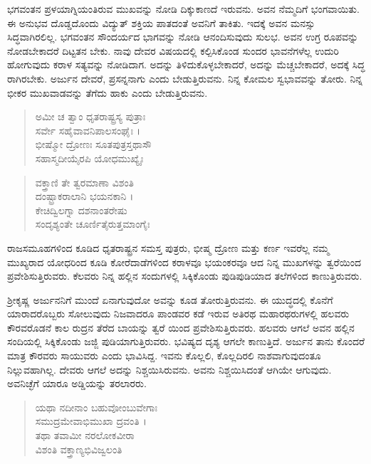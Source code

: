 ಭಗವಂತನ ಪ್ರಳಯಾಗ್ನಿಯಂತಿರುವ ಮುಖವನ್ನು ನೋಡಿ ದಿಕ್ಕುಕಾಣದೆ ಇರುವನು. ಅವನ ನೆಮ್ಮದಿಗೆ ಭಂಗವಾಯಿತು. ಈ ಅನುಭವ ದೊಡ್ಡದೊಂದು ವಿದ್ಯುತ್ ಶಕ್ತಿಯ ಪಾತದಂತೆ ಅವನಿಗೆ ತಾಕಿತು. ಇದಕ್ಕೆ ಅವನ ಮನಸ್ಸು ಸಿದ್ಧವಾಗಿರಲಿಲ್ಲ. ಭಗವಂತನ ಸೌಂದರ್ಯದ ಭಾಗವನ್ನು ನೋಡಿ ಆನಂದಿಸುವುದು ಸುಲಭ. ಅವನ ಉಗ್ರ ರೂಪವನ್ನು ನೋಡಬೇಕಾದರೆ ದಿಟ್ಟತನ ಬೇಕು. ನಾವು ದೇವರ ವಿಷಯದಲ್ಲಿ ಕಲ್ಪಿಸಿಕೊಂಡ ಸುಂದರ ಭಾವನೆಗಳೆಲ್ಲ ಉದುರಿ ಹೋಗುವುದು ಕರಾಳ ಸತ್ಯವನ್ನು ನೋಡಿದಾಗ. ಅದನ್ನು ತಿಳಿದುಕೊಳ್ಳಬೇಕಾದರೆ, ಅದನ್ನು ಮೆಚ್ಚಬೇಕಾದರೆ, ಅದಕ್ಕೆ ಸಿದ್ಧ ರಾಗಿರಬೇಕು. ಅರ್ಜುನ ದೇವರೆ, ಪ್ರಸನ್ನನಾಗು ಎಂದು ಬೇಡುತ್ತಿರುವನು. ನಿನ್ನ ಕೋಮಲ ಸ್ವಭಾವವನ್ನು ತೋರು. ನಿನ್ನ ಭೀಕರ ಮುಖವಾಡವನ್ನು ತೆಗೆದು ಹಾಕು ಎಂದು ಬೇಡುತ್ತಿರುವನು.

\begin{verse}
ಅಮೀ ಚ ತ್ವಾಂ ಧೃತರಾಷ್ಟ್ರಸ್ಯ ಪುತ್ರಾಃ \\ ಸರ್ವೇ ಸಹೈವಾವನಿಪಾಲಸಂಘೈಃ ।\\ಭೀಷ್ಮೋ ದ್ರೋಣಃ ಸೂತಪುತ್ರಸ್ತಥಾಸೌ \\ ಸಹಾಸ್ಮದೀಯೈರಪಿ ಯೋಧಮುಖ್ಯೈಃ 
\end{verse}

\begin{verse}
ವಕ್ತ್ರಾಣಿ ತೇ ತ್ವರಮಾಣಾ ವಿಶಂತಿ \\ ದಂಷ್ಟ್ರಾಕರಾಲಾನಿ ಭಯನಕಾನಿ ।\\ಕೇಚಿದ್ವಿಲಗ್ನಾ ದಶನಾಂತರೇಷು \\ ಸಂದೃಶ್ಯಂತೇ ಚೂರ್ಣಿತೈರುತ್ತಮಾಂಗೈಃ 
\end{verse}

{\small ರಾಜಸಮೂಹಗಳಿಂದ ಕೂಡಿದ ಧೃತರಾಷ್ಟ್ರನ ಸಮಸ್ತ ಪುತ್ರರು, ಭೀಷ್ಮ ದ್ರೋಣ ಮತ್ತು ಕರ್ಣ ಇವರೆಲ್ಲ ನಮ್ಮ ಮುಖ್ಯರಾದ ಯೋಧರಿಂದ ಕೂಡಿ ಕೋರೆದಾಡೆಗಳಿಂದ ಕರಾಳವೂ ಭಯಂಕರವೂ ಆದ ನಿನ್ನ ಮುಖಗಳನ್ನು ತ್ವರೆಯಿಂದ ಪ್ರವೇಶಿಸುತ್ತಿರುವರು. ಕೆಲವರು ನಿನ್ನ ಹಲ್ಲಿನ ಸಂದುಗಳಲ್ಲಿ ಸಿಕ್ಕಿಕೊಂಡು ಪುಡಿಪುಡಿಯಾದ ತಲೆಗಳಿಂದ ಕಾಣುತ್ತಿರುವರು.}

ಶ್ರೀಕೃಷ್ಣ ಅರ್ಜುನನಿಗೆ ಮುಂದೆ ಏನಾಗುವುದೋ ಅವನ್ನು ಕೂಡ ತೋರುತ್ತಿರುವನು. ಈ ಯುದ್ಧದಲ್ಲಿ ಕೊನೆಗೆ ಯಾರಾದರೊಬ್ಬರು ಸೋಲುವುದು ನಿಜವಾದರೂ ಪಾಂಡವರ ಕಡೆ ಇರುವ ಅತಿರಥ ಮಹಾರಥರುಗಳಲ್ಲಿ ಹಲವರು ಕೌರವರೊಡನೆ ಕಾಲ ರುದ್ರನ ತೆರೆದ ಬಾಯನ್ನು ತ್ವರೆ ಯಿಂದ ಪ್ರವೇಶಿಸುತ್ತಿರುವರು. ಹಲವರು ಆಗಲೆ ಅವನ ಹಲ್ಲಿನ ಸಂದಿಯಲ್ಲಿ ಸಿಕ್ಕಿಕೊಂಡು ಜಜ್ಜಿ ಪುಡಿಯಾಗುತ್ತಿರುವರು. ಭವಿಷ್ಯದ ದೃಶ್ಯ ಆಗಲೇ ಕಾಣುತ್ತಿದೆ. ಅರ್ಜುನ ತಾನು ಕೊಂದರೆ ಮಾತ್ರ ಕೌರವರು ಸಾಯುವರು ಎಂದು ಭಾವಿಸಿದ್ದ. ಇವನು ಕೊಲ್ಲಲಿ, ಕೊಲ್ಲದಿರಲಿ ನಾಶವಾಗುವುದಂತೂ ನಿಲ್ಲುವಹಾಗಿಲ್ಲ. ದೇವರು ಆಗಲೆ ಅದನ್ನು ನಿಶ್ಚಯಿಸಿರುವನು. ಅವನು ನಿಶ್ಚಯಿಸಿದಂತೆ ಆಗಿಯೇ ಆಗುವುದು. ಅವನಿಚ್ಛೆಗೆ ಯಾರೂ ಅಡ್ಡಿಯನ್ನು ತರಲಾರರು.

\begin{verse}
ಯಥಾ ನದೀನಾಂ ಬಹುವೋಂಬುವೇಗಾಃ \\ ಸಮುದ್ರಮೇವಾಭಿಮುಖಾ ದ್ರವಂತಿ ।\\ತಥಾ ತವಾಮೀ ನರಲೋಕವೀರಾ \\ ವಿಶಂತಿ ವಕ್ತ್ರಾಣ್ಯಭಿವಿಜ್ವಲಂತಿ 
\end{verse}

